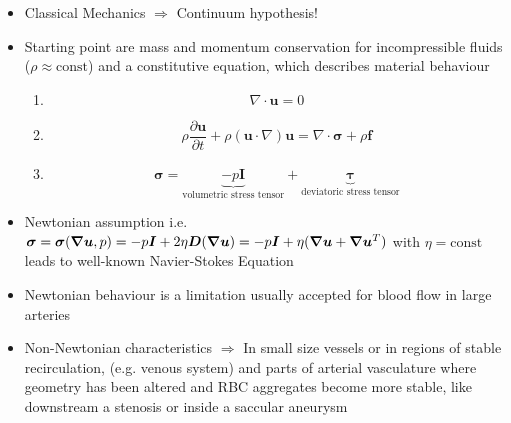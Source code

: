 \documentclass{beamer}
\begin{document}
	
	    \begin{frame}
	    \begin{itemize}
	        \item        Classical Mechanics
			    $\Rightarrow$ Continuum hypothesis!
			    \item Starting point are mass and momentum conservation for incompressible fluids ($\rho \approx \text{const}$) and a constitutive equation, which describes material behaviour 
	    \begin{enumerate}
			    \item \begin{equation*}
			         \nabla \cdot \bm{u} = 0
			    \end{equation*}
			      \item \begin{equation*}
			         \rho  \frac{\partial \bm{u}}{\partial t} + \rho (\bm{u} \cdot \nabla) \bm{u} =  \nabla \cdot \bm{\sigma} + \rho\bm{f}
			    \end{equation*}
			    \item \begin{equation*}\bm{\sigma} = \underbrace{-p\bm{I} }_{\text{volumetric stress tensor}} + \underbrace{\bm{\tau}   }_{\text{deviatoric stress tensor}} \end{equation*}
			    \end{enumerate}	
			 
			    \item Newtonian assumption i.e. $
    \bm{\sigma} = \bm{\sigma}(\grad\bm{u},p)= -p\bm{I} +2\eta\bm{D}(\grad\bm{u})= -p\bm{I} + \eta(\grad\bm{u}+\grad\bm{u}^T)$
    with $\eta = \text{const}$ leads to well-known Navier-Stokes Equation
	    \end{itemize}
		    \end{frame}

	
	    \begin{frame}
	    \begin{itemize}
        \item Newtonian behaviour is a limitation usually accepted for blood flow in large arteries
        \item Non-Newtonian
characteristics $\Rightarrow$ In small size vessels or in regions of stable recirculation, (e.g. venous system) and parts of  arterial vasculature where geometry has been altered and RBC aggregates become more stable,
like downstream a stenosis or inside a saccular aneurysm
	    \end{itemize}
		    \end{frame}
	
\end{document}
